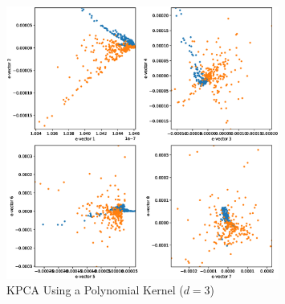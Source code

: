 \documentclass{article}[12pt]
\begin{document}
\begin{enumerate}
\begin{figure}
	\centering
\includegraphics[width=0.8\textwidth]{./img/kpca_polynomial_3.eps}
\caption{\label{fig:kpca_poly}KPCA Using a Polynomial Kernel ($d=3$)}
\end{figure}

\end{enumerate}
\end{document}

